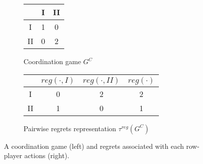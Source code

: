 \documentclass[fleqn,reqno,11pt]{article}
\begin{document}
\begin{figure}

  \begin{subfigure}[b]{0.3\textwidth}
    \centering
    \begin{tabular}{ccc}
      \toprule
      & I & II \\
      \midrule
      I & 1 & 0 \\
      II & 0 & 2\\
      \bottomrule
    \end{tabular}
    \caption{Coordination game $G^C$}
    \label{coordgame1}
  \end{subfigure}
  \hspace{1cm}
  \begin{subfigure}[b]{0.5\textwidth}
    \centering
    \begin{tabular}{cccc}
      \toprule
      & $reg( \cdot, I)$ & $reg(\cdot, II)$ & $reg(\cdot)$ \\
      \midrule
      I  & 0 & 2 & 2 \\ 
      II & 1 & 0 & 1\\
      \bottomrule
    \end{tabular}
    \caption{Pairwise regrets representation $\tau^{reg}(G^C)$}
    \label{coordgame1reg}
  \end{subfigure}
  \caption{A coordination game (left) and regrets associated with each row-player actions (right).}
    \label{coordgame1mainFig}
\end{figure}
\end{document}
